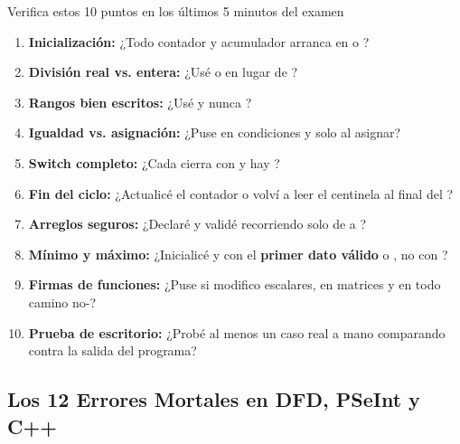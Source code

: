 \documentclass[11pt,letterpaper]{article}
\begin{document}
\begin{consejo}[top=2.2mm,bottom=2.2mm]{Verifica estos 10 puntos en los últimos 5 minutos del examen}
\begin{enumerate}[itemsep=1pt,topsep=2pt,parsep=0pt]
  \item \textbf{Inicialización:} ¿Todo contador y acumulador arranca en  o ?
  \item \textbf{División real vs. entera:} ¿Usé  o  en lugar de ?
  \item \textbf{Rangos bien escritos:} ¿Usé  y nunca ?
  \item \textbf{Igualdad vs. asignación:} ¿Puse \codigo{==} en condiciones y \codigo{=} solo al asignar?
  \item \textbf{Switch completo:} ¿Cada  cierra con  y hay ?
  \item \textbf{Fin del ciclo:} ¿Actualicé el contador o volví a leer el centinela al final del ?
  \item \textbf{Arreglos seguros:} ¿Declaré  y validé  recorriendo solo de  a ?
  \item \textbf{Mínimo y máximo:} ¿Inicialicé  y  con el \textbf{primer dato válido} o , no con ?
  \item \textbf{Firmas de funciones:} ¿Puse \codigo{\&} si modifico escalares, \codigo{[][MAX\_C]} en matrices y  en todo camino no-?
  \item \textbf{Prueba de escritorio:} ¿Probé al menos un caso real a mano comparando contra la salida del programa?
\end{enumerate}
\end{consejo}

\newpage
\subsection{Los 12 Errores Mortales en DFD, PSeInt y C++}
\end{document}
